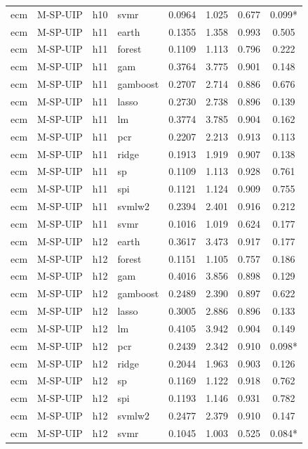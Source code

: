 \begin{ThreePartTable}
\begin{longtable}[t]{llclcccc}
ecm & M-SP-UIP & h10 & svmr & 0.0964 & 1.025 & 0.677 & 0.099*\\
\addlinespace
ecm & M-SP-UIP & h11 & earth & 0.1355 & 1.358 & 0.993 & 0.505\\
ecm & M-SP-UIP & h11 & forest & 0.1109 & 1.113 & 0.796 & 0.222\\
ecm & M-SP-UIP & h11 & gam & 0.3764 & 3.775 & 0.901 & 0.148\\
ecm & M-SP-UIP & h11 & gamboost & 0.2707 & 2.714 & 0.886 & 0.676\\
ecm & M-SP-UIP & h11 & lasso & 0.2730 & 2.738 & 0.896 & 0.139\\
ecm & M-SP-UIP & h11 & lm & 0.3774 & 3.785 & 0.904 & 0.162\\
ecm & M-SP-UIP & h11 & pcr & 0.2207 & 2.213 & 0.913 & 0.113\\
ecm & M-SP-UIP & h11 & ridge & 0.1913 & 1.919 & 0.907 & 0.138\\
ecm & M-SP-UIP & h11 & sp & 0.1109 & 1.113 & 0.928 & 0.761\\
ecm & M-SP-UIP & h11 & spi & 0.1121 & 1.124 & 0.909 & 0.755\\
ecm & M-SP-UIP & h11 & svmlw2 & 0.2394 & 2.401 & 0.916 & 0.212\\
ecm & M-SP-UIP & h11 & svmr & 0.1016 & 1.019 & 0.624 & 0.177\\
\addlinespace
ecm & M-SP-UIP & h12 & earth & 0.3617 & 3.473 & 0.917 & 0.177\\
ecm & M-SP-UIP & h12 & forest & 0.1151 & 1.105 & 0.757 & 0.186\\
ecm & M-SP-UIP & h12 & gam & 0.4016 & 3.856 & 0.898 & 0.129\\
ecm & M-SP-UIP & h12 & gamboost & 0.2489 & 2.390 & 0.897 & 0.622\\
ecm & M-SP-UIP & h12 & lasso & 0.3005 & 2.886 & 0.896 & 0.133\\
ecm & M-SP-UIP & h12 & lm & 0.4105 & 3.942 & 0.904 & 0.149\\
ecm & M-SP-UIP & h12 & pcr & 0.2439 & 2.342 & 0.910 & 0.098*\\
ecm & M-SP-UIP & h12 & ridge & 0.2044 & 1.963 & 0.903 & 0.126\\
ecm & M-SP-UIP & h12 & sp & 0.1169 & 1.122 & 0.918 & 0.762\\
ecm & M-SP-UIP & h12 & spi & 0.1193 & 1.146 & 0.931 & 0.782\\
ecm & M-SP-UIP & h12 & svmlw2 & 0.2477 & 2.379 & 0.910 & 0.147\\
ecm & M-SP-UIP & h12 & svmr & 0.1045 & 1.003 & 0.525 & 0.084*\\

\end{longtable}
\end{ThreePartTable}
